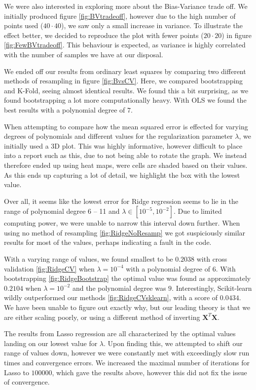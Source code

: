 \documentclass{article}
\begin{document}
We were also interested in exploring more about the Bias-Variance trade off. We initially produced figure \ref{fig:BVtradeoff}, however due to the high number of points used ($40 \cdot 40$), we saw only a small increase in variance. To illustrate the effect better, we decided to reproduce the plot with fewer points ($20 \cdot 20$) in figure \ref{fig:FewBVtradeoff}. This behaviour is expected, as variance is highly correlated with the number of samples we have at our disposal.

We ended off our results from ordinary least squares by comparing two different methods of resampling in figure \ref{fig:BvsCV}. Here, we compared bootstrapping and K-Fold, seeing almost identical results. We found this a bit surprising, as we found bootstrapping a lot more computationally heavy. With OLS we found the best results with a polynomial degree of $7$.

When attempting to compare how the mean squared error is effected for varying degrees of polynomials and different values for the regularization parameter $\lambda$, we initially used a 3D plot. This was highly informative, however difficult to place into a report such as this, due to not being able to rotate the graph. We instead therefore ended up using heat maps, were cells are shaded based on their values. As this ends up capturing a lot of detail, we highlight the box with the lowest value.

Over all, it seems like the lowest error for Ridge regression seems to lie in the range of polynomial degree 6 -- 11 and $\lambda \in [10^{-5}, 10^{-2}]$. Due to limited computing power, we were unable to narrow this interval down further. When using no method of resampling \ref{fig:RidgeNoResamp} we got suspiciously similar results for most of the values, perhaps indicating a fault in the code.

With a varying range of values, we found smallest to be $0.2038$ with cross validation \ref{fig:RidgeCV} when $\lambda = 10^{-4}$ with a polynomial degree of $6$. With bootstrapping \ref{fig:RidgeBootstrap} the optimal value was found as approximately $0.2104$ when $\lambda = 10^{-2}$ and the polynomial degree was $9$. Interestingly, Scikit-learn wildly outperformed our methods \ref{fig:RidgeCVsklearn}, with a score of $0.0434$. We have been unable to figure out exactly why, but our leading theory is that we are either scaling poorly, or using a different method of inverting $\textbf{X}^T \textbf{X}$.

The results from Lasso regression are all characterized by the optimal values landing on our lowest value for $\lambda$. Upon finding this, we attempted to shift our range of values down, however we were constantly met with exceedingly slow run times and convergence errors. We increased the maximal number of iterations for Lasso to $100000$, which gave the results above, however this did not fix the issue of convergence.
\end{document}
